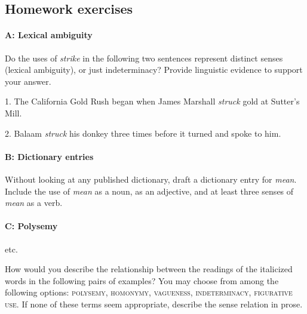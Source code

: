 \subsection*{Homework exercises}
\paragraph*{A: Lexical ambiguity}

Do the uses of \textit{strike} in the following two sentences represent distinct senses (lexical ambiguity), or just indeterminacy? Provide linguistic evidence to support your answer.

1. The California Gold Rush began when James Marshall \textit{struck} gold at Sutter’s Mill.

2. Balaam \textit{struck} his donkey three times before it turned and spoke to him.

\paragraph*{B: Dictionary entries}

Without looking at any published dictionary, draft a dictionary entry for \textit{mean}. Include the use of \textit{mean} as a noun, as an adjective, and at least three senses of \textit{mean} as a verb.

\paragraph*{C: Polysemy}etc.\footnotemark{}

How would you describe the relationship between the readings of the italicized words in the following pairs of examples? You may choose from among the following options: \textsc{polysemy, homonymy, vagueness, indeterminacy, figurative use.} If none of these terms seem appropriate, describe the sense relation in prose.

